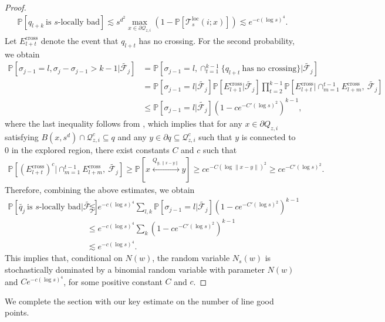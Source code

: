 \documentclass[11pt]{article}
\theoremstyle{definition}
\theoremstyle{remark}
\newcommand{\bP}{\mathbb{P}}
\numberwithin{equation}{section}
\theoremstyle{plain}
\theoremstyle{definition}
\theoremstyle{remark}
\theoremstyle{plain}
\begin{document}
\begin{proof}
\begin{align*}
     \bP[q_{l+k}~\text{is $s$-locally bad}] \lesssim s^{d^2}\max_{x \in \partial \mathcal Q_{z,i}}(1-\bP[\mathcal T_{s}^{\mathrm{loc}}(i;x)])\lesssim e^{-c(\log s)^4}.
  \end{align*}
Let $E_{l+t}^{\mathrm{cross}}$ denote the event that $q_{l+t}$ has no crossing. For the second probability, we obtain
   \begin{align*}
    \bP[\sigma_{j-1}=l,\sigma_j-\sigma_{j-1}>k-1|\tilde{\mathcal F_j}]&= \bP[\sigma_{j-1}=l,\cap_{t=1}^{k-1}\{q_{l+t}~\text{has no crossing}\}|\tilde{\mathcal F_j}] \\
    &=\bP[\sigma_{j-1}=l|\tilde{\mathcal F_j}]\bP[E_{l+1}^{\mathrm{cross}}|\tilde{\mathcal F_j}]\prod_{t=2}^{k-1}\bP[E_{l+t}^{\mathrm{cross}}|\cap^{t-1}_{m=1}E_{l+m}^{\mathrm{cross}},~\tilde{\mathcal F_j}]\\
    &\le \bP[\sigma_{j-1}=l|\tilde{\mathcal F_j}](1-ce^{-C'(\log s)^2})^{k-1},
  \end{align*}
  where the last inequality follows from \cite[Lemma~5.8]{ASS}, which implies that for any $x \in \mathcal \partial Q_{z,i}$ satisfying $B(x,s^d)\cap \mathcal Q_{z,i}^c\subseteq q$ and any $y \in \partial q \subseteq  \mathcal Q_{z,i}^c$ such that $y$ is connected to $0$ in the explored region, there exist constants $C$ and $c$ such that
  \begin{align*}
 \bP[(E_{l+t}^{\mathrm{cross}})^c|\cap^{t-1}_{m=1}E_{l+m}^{\mathrm{cross}},~\tilde{\mathcal F_j}]\ge \bP[x \overset{Q_{y,\lVert x-y\rVert }}{\longleftrightarrow} y] \ge ce^{-C(\log \lVert x-y\rVert)^2 }\ge ce^{-C'(\log s)^2}.
  \end{align*}
Therefore, combining the above estimates, we obtain
\begin{align}
 \bP[\tilde{q_j}~\text{is $s$-locally bad}|\tilde{\mathcal F_j}]&\lesssim e^{-c(\log s)^4}\sum_{l,k}\bP[\sigma_{j-1}=l|\tilde{\mathcal F_j}](1-ce^{-C'(\log s)^2})^{k-1}\nonumber\\
 &\le e^{-c(\log s)^4}\sum_{k}(1-ce^{-C'(\log s)^2})^{k-1}\nonumber\\
 &\lesssim e^{-c(\log s)^4}. \nonumber
\end{align}
This implies that, conditional on $N(w)$, the random variable $N_s(w)$ is stochastically dominated by a binomial random variable with parameter $N(w)$ and $Ce^{-c(\log s)^4}$, for some positive constant $C$ and $c$.
\end{proof}

We complete the section with our key estimate on the number of line good points.
\end{document}
